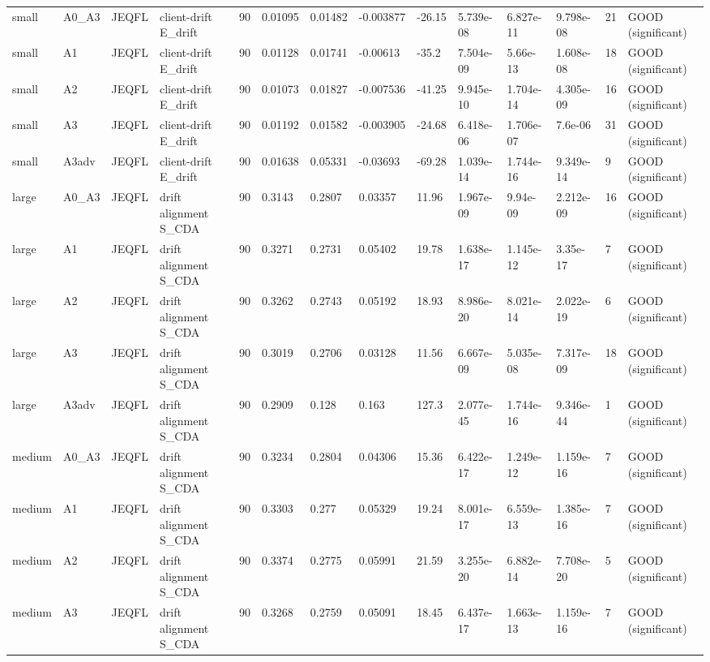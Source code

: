 \begin{table}[t]
\begin{tabular}{llllllllllllll}
small & A0\_A3 & JEQFL & client-drift E\_drift & 90 & 0.01095 & 0.01482 & -0.003877 & -26.15 & 5.739e-08 & 6.827e-11 & 9.798e-08 & 21 & GOOD (significant) \\
small & A1 & JEQFL & client-drift E\_drift & 90 & 0.01128 & 0.01741 & -0.00613 & -35.2 & 7.504e-09 & 5.66e-13 & 1.608e-08 & 18 & GOOD (significant) \\
small & A2 & JEQFL & client-drift E\_drift & 90 & 0.01073 & 0.01827 & -0.007536 & -41.25 & 9.945e-10 & 1.704e-14 & 4.305e-09 & 16 & GOOD (significant) \\
small & A3 & JEQFL & client-drift E\_drift & 90 & 0.01192 & 0.01582 & -0.003905 & -24.68 & 6.418e-06 & 1.706e-07 & 7.6e-06 & 31 & GOOD (significant) \\
small & A3adv & JEQFL & client-drift E\_drift & 90 & 0.01638 & 0.05331 & -0.03693 & -69.28 & 1.039e-14 & 1.744e-16 & 9.349e-14 & 9 & GOOD (significant) \\
large & A0\_A3 & JEQFL & drift alignment S\_CDA & 90 & 0.3143 & 0.2807 & 0.03357 & 11.96 & 1.967e-09 & 9.94e-09 & 2.212e-09 & 16 & GOOD (significant) \\
large & A1 & JEQFL & drift alignment S\_CDA & 90 & 0.3271 & 0.2731 & 0.05402 & 19.78 & 1.638e-17 & 1.145e-12 & 3.35e-17 & 7 & GOOD (significant) \\
large & A2 & JEQFL & drift alignment S\_CDA & 90 & 0.3262 & 0.2743 & 0.05192 & 18.93 & 8.986e-20 & 8.021e-14 & 2.022e-19 & 6 & GOOD (significant) \\
large & A3 & JEQFL & drift alignment S\_CDA & 90 & 0.3019 & 0.2706 & 0.03128 & 11.56 & 6.667e-09 & 5.035e-08 & 7.317e-09 & 18 & GOOD (significant) \\
large & A3adv & JEQFL & drift alignment S\_CDA & 90 & 0.2909 & 0.128 & 0.163 & 127.3 & 2.077e-45 & 1.744e-16 & 9.346e-44 & 1 & GOOD (significant) \\
medium & A0\_A3 & JEQFL & drift alignment S\_CDA & 90 & 0.3234 & 0.2804 & 0.04306 & 15.36 & 6.422e-17 & 1.249e-12 & 1.159e-16 & 7 & GOOD (significant) \\
medium & A1 & JEQFL & drift alignment S\_CDA & 90 & 0.3303 & 0.277 & 0.05329 & 19.24 & 8.001e-17 & 6.559e-13 & 1.385e-16 & 7 & GOOD (significant) \\
medium & A2 & JEQFL & drift alignment S\_CDA & 90 & 0.3374 & 0.2775 & 0.05991 & 21.59 & 3.255e-20 & 6.882e-14 & 7.708e-20 & 5 & GOOD (significant) \\
medium & A3 & JEQFL & drift alignment S\_CDA & 90 & 0.3268 & 0.2759 & 0.05091 & 18.45 & 6.437e-17 & 1.663e-13 & 1.159e-16 & 7 & GOOD (significant) \\

\end{tabular}
\end{table}
